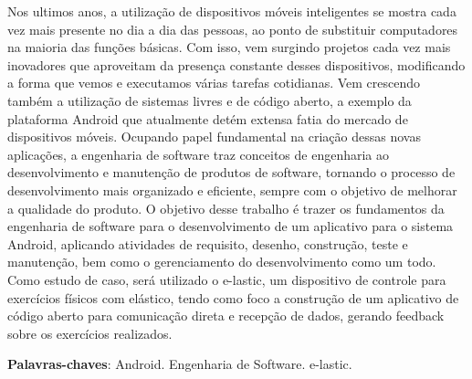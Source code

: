 \begin{resumo}

Nos ultimos anos, a utilização de dispositivos móveis inteligentes se mostra cada vez mais presente no dia a dia das pessoas, ao ponto de substituir computadores na maioria das funções básicas. Com isso, vem surgindo projetos cada vez mais inovadores que aproveitam da presença constante desses dispositivos, modificando a forma que vemos e executamos várias tarefas cotidianas. Vem crescendo também a utilização de sistemas livres e de código aberto, a exemplo da plataforma Android que atualmente detém extensa fatia do mercado de dispositivos móveis. Ocupando papel fundamental na criação dessas novas aplicações, a engenharia de software traz conceitos de engenharia ao desenvolvimento e manutenção de produtos de software, tornando o processo de desenvolvimento mais organizado e eficiente, sempre com o objetivo de melhorar a qualidade do produto. O objetivo desse trabalho é trazer os fundamentos da engenharia de software para o desenvolvimento de um aplicativo para o sistema Android, aplicando atividades de requisito, desenho, construção, teste e manutenção, bem como o gerenciamento do desenvolvimento como um todo. Como estudo de caso, será utilizado o e-lastic, um dispositivo de controle para exercícios físicos com elástico, tendo como foco a construção de um aplicativo de código aberto para comunicação direta e recepção de dados, gerando feedback sobre os exercícios realizados.

\vspace{\onelineskip}
    
 \noindent
 \textbf{Palavras-chaves}: Android. Engenharia de Software. e-lastic.

\end{resumo}
